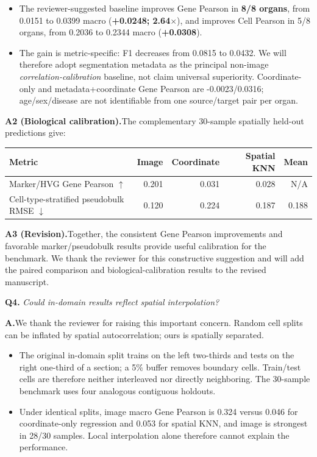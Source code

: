 \documentclass[10pt]{article}
\newcommand{\questionsep}{\par\vspace{0.75em}}
\begin{document}
\begin{itemize}
\item The reviewer-suggested baseline improves Gene Pearson in
\textbf{8/8 organs}, from 0.0151 to 0.0399 macro
(\textbf{+0.0248; 2.64\(\times\)}), and improves Cell Pearson in 5/8 organs,
from 0.2036 to 0.2344 macro (\textbf{+0.0308}).
\item The gain is metric-specific: F1 decreases from 0.0815 to 0.0432. We will
therefore adopt segmentation metadata as the principal non-image
\emph{correlation-calibration} baseline, not claim universal superiority.
Coordinate-only and metadata+coordinate Gene Pearson are -0.0023/0.0316;
age/sex/disease are not identifiable from one source/target pair per organ.
\end{itemize}

\textbf{A2 (Biological calibration).}\enspace The complementary 30-sample
spatially held-out predictions give:

\begin{center}
\begingroup
\small
\setlength{\tabcolsep}{4pt}
\begin{tabular}{lrrrr}
\toprule
Metric & Image & Coordinate & Spatial KNN & Mean \\
\midrule
Marker/HVG Gene Pearson \(\uparrow\) & 0.201 & 0.031 & 0.028 & N/A \\
Cell-type-stratified pseudobulk RMSE \(\downarrow\) &
0.120 & 0.224 & 0.187 & 0.188 \\
\bottomrule
\end{tabular}
\endgroup
\end{center}

\textbf{A3 (Revision).}\enspace Together, the consistent Gene Pearson
improvements and favorable marker/pseudobulk results provide useful calibration
for the benchmark. We thank the reviewer for this constructive suggestion and
will add the paired comparison and biological-calibration results to the
revised manuscript.

\questionsep
\textbf{Q4.}\quad
\textit{Could in-domain results reflect spatial interpolation?}

\textbf{A.}\enspace We thank the reviewer for raising this important concern.
Random cell splits can be inflated by spatial autocorrelation; ours is
spatially separated.
\begin{itemize}
\item The original in-domain split trains on the left two-thirds and tests on
the right one-third of a section; a 5\% buffer removes boundary cells.
Train/test cells are therefore neither interleaved nor directly neighboring.
The 30-sample benchmark uses four analogous contiguous holdouts.
\item Under identical splits, image macro Gene Pearson is 0.324 versus 0.046
for coordinate-only regression and 0.053 for spatial KNN, and image is
strongest in 28/30 samples. Local interpolation alone therefore cannot explain
the performance.
\end{itemize}
\end{document}
